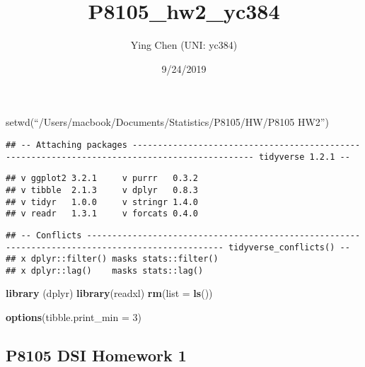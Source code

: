 \documentclass[]{article}
\title{P8105\_hw2\_yc384}
\author{Ying Chen (UNI: yc384)}
\date{9/24/2019}
\newenvironment{Shaded}{\begin{snugshade}}{\end{snugshade}}
\newcommand{\DataTypeTok}[1]{\textcolor[rgb]{0.13,0.29,0.53}{#1}}
\newcommand{\DecValTok}[1]{\textcolor[rgb]{0.00,0.00,0.81}{#1}}
\newcommand{\KeywordTok}[1]{\textcolor[rgb]{0.13,0.29,0.53}{\textbf{#1}}}
\newcommand{\NormalTok}[1]{#1}
\newcommand{\OperatorTok}[1]{\textcolor[rgb]{0.81,0.36,0.00}{\textbf{#1}}}
\newcommand{\OtherTok}[1]{\textcolor[rgb]{0.56,0.35,0.01}{#1}}
\begin{document}
\maketitle

setwd(``/Users/macbook/Documents/Statistics/P8105/HW/P8105 HW2'')

\begin{Shaded}
\end{Shaded}

\begin{verbatim}
## -- Attaching packages ---------------------------------------------------------------------------------------------- tidyverse 1.2.1 --
\end{verbatim}

\begin{verbatim}
## v ggplot2 3.2.1     v purrr   0.3.2
## v tibble  2.1.3     v dplyr   0.8.3
## v tidyr   1.0.0     v stringr 1.4.0
## v readr   1.3.1     v forcats 0.4.0
\end{verbatim}

\begin{verbatim}
## -- Conflicts ------------------------------------------------------------------------------------------------- tidyverse_conflicts() --
## x dplyr::filter() masks stats::filter()
## x dplyr::lag()    masks stats::lag()
\end{verbatim}

\begin{Shaded}
\begin{Highlighting}[]
\KeywordTok{library}\NormalTok{ (dplyr)}
\KeywordTok{library}\NormalTok{(readxl)}
\KeywordTok{rm}\NormalTok{(}\DataTypeTok{list =} \KeywordTok{ls}\NormalTok{())}

\KeywordTok{options}\NormalTok{(}\DataTypeTok{tibble.print_min =} \DecValTok{3}\NormalTok{)}
\end{Highlighting}
\end{Shaded}

\hypertarget{p8105-dsi-homework-1}{%
\subsection{P8105 DSI Homework 1}\label{p8105-dsi-homework-1}}
\end{document}
